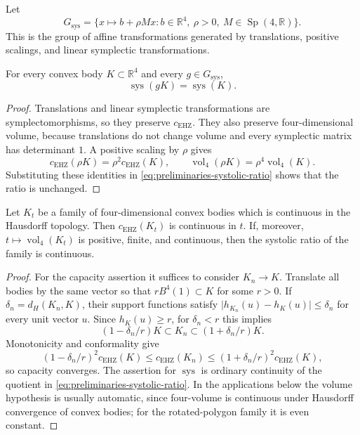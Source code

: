 \begin{definition}
\label{def:preliminaries-systolic-ratio-symmetries}
Let
\[
  G_{\operatorname{sys}}
  =
  \{x\mapsto b+\rho Mx:
    b\in\mathbb R^4,\ \rho>0,\ M\in\operatorname{Sp}(4,\mathbb R)\}.
\]
This is the group of affine transformations generated by translations,
positive scalings, and linear symplectic transformations.
\end{definition}

\begin{lemma}
\label{lem:preliminaries-systolic-ratio-invariance}
For every convex body \(K\subset\mathbb R^4\) and every
\(g\in G_{\operatorname{sys}}\),
\[
  \operatorname{sys}(gK)=\operatorname{sys}(K).
\]
\end{lemma}

\begin{proof}
Translations and linear symplectic transformations are symplectomorphisms, so
they preserve \(c_{\mathrm{EHZ}}\). They also preserve four-dimensional
volume, because translations do not change volume and every symplectic matrix
has determinant \(1\). A positive scaling by \(\rho\) gives
\[
  c_{\mathrm{EHZ}}(\rho K)=\rho^2c_{\mathrm{EHZ}}(K),
  \qquad
  \operatorname{vol}_4(\rho K)=\rho^4\operatorname{vol}_4(K).
\]
Substituting these identities in
\eqref{eq:preliminaries-systolic-ratio} shows that the ratio is unchanged.
\end{proof}

\begin{proposition}[Continuity]\label{prop:preliminaries-sys-hausdorff-continuity}
Let \(K_t\) be a family of four-dimensional convex bodies which is continuous
in the Hausdorff topology. Then \(c_{\mathrm{EHZ}}(K_t)\) is continuous in
\(t\). If, moreover, \(t\mapsto\operatorname{vol}_4(K_t)\) is positive,
finite, and continuous, then the systolic ratio of the family is continuous.
\end{proposition}

\begin{proof}
For the capacity assertion it suffices to consider \(K_n\to K\). Translate
all bodies by the same vector so that \(rB^4(1)\subset K\) for some
\(r>0\). If \(\delta_n=d_H(K_n,K)\), their support functions satisfy
\(\lvert h_{K_n}(u)-h_K(u)\rvert\leq\delta_n\) for every unit vector
\(u\). Since \(h_K(u)\geq r\), for \(\delta_n<r\) this implies
\[
 (1-\delta_n/r)K\subset K_n\subset(1+\delta_n/r)K.
\]
Monotonicity and conformality give
\[
 (1-\delta_n/r)^2c_{\mathrm{EHZ}}(K)
 \leq c_{\mathrm{EHZ}}(K_n)
 \leq(1+\delta_n/r)^2c_{\mathrm{EHZ}}(K),
\]
so capacity converges. The assertion for \(\operatorname{sys}\) is
ordinary continuity of the quotient in
\eqref{eq:preliminaries-systolic-ratio}. In the applications below the volume
hypothesis is usually automatic, since four-volume is continuous under
Hausdorff convergence of convex bodies; for the rotated-polygon family it is
even constant.
\end{proof}
